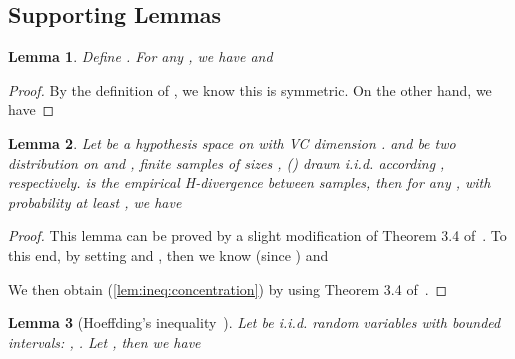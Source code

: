 \documentclass[10pt,twocolumn,letterpaper]{article}
\newtheorem{lemma}{Lemma}
\begin{document}
\subsection{Supporting Lemmas}
\begin{lemma}\label{lem:triangle}
Define . For any , we have  and

\end{lemma}
\begin{proof}\renewcommand{\qedsymbol}{}
 By the definition of , we know this is symmetric. On the other hand, we have
 
\end{proof}
\begin{lemma}\label{lem:concentration}
    Let  be a hypothesis space on  with VC dimension .  and  be two distribution on  and ,  finite samples of sizes ,  () drawn i.i.d. according ,  respectively.  is the empirical H-divergence between samples, then for any , with probability at least , we have
    
\end{lemma}
\begin{proof}\renewcommand{\qedsymbol}{}
    This lemma can be proved by a slight modification of Theorem 3.4 of~\cite{kifer2004detecting}. To this end, by setting  and , then we know  (since ) and
    
    We then obtain (\ref{lem:ineq:concentration}) by using Theorem 3.4 of~\cite{kifer2004detecting}.
\end{proof}
\begin{lemma}[Hoeffding's inequality~\cite{hoeffding1963probability}]\label{lem:hoeffding}
Let  be i.i.d. random variables with bounded intervals: , . Let , then we have

\end{lemma} 
\end{document}
